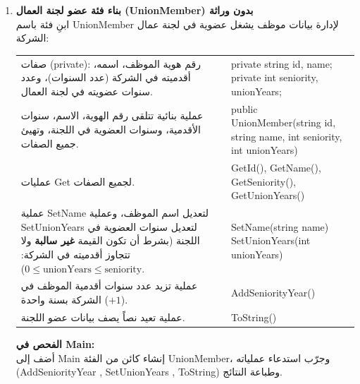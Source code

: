 \documentclass[14pt]{extarticle}
\begin{document}
\begin{enumerate}[label=\textbf{تمرين \arabic*:}, wide=0pt, itemsep=2.2em]
    \item \textbf{بناء فئة عضو لجنة العمال (\textenglish{UnionMember}) بدون وراثة} \\
    ابنِ فئة باسم \textenglish{UnionMember} لإدارة بيانات موظف يشغل عضوية في لجنة عمال الشركة:

    {\renewcommand{\arraystretch}{1.2}
    \small
    \begin{longtable}{|>{\raggedleft\arraybackslash}p{}|>{\raggedright\arraybackslash}p{}|}
    \hline
    \multicolumn{2}{|c|}{\textbf{الفئة: \textenglish{UnionMember}}} \\
    \hline
    صفات (\textenglish{private}): رقم هوية الموظف، اسمه، أقدميته في الشركة (عدد السنوات)، وعدد سنوات عضويته في لجنة العمال. & \textenglish{private string id, name;} \newline \textenglish{private int seniority, unionYears;} \\
    \hline
    عملية بنائية تتلقى رقم الهوية، الاسم، سنوات الأقدمية، وسنوات العضوية في اللجنة، وتهيئ جميع الصفات. & \textenglish{public UnionMember(string id, string name, int seniority, int unionYears)} \\
    \hline
    عمليات \textenglish{Get} لجميع الصفات. & \textenglish{GetId(), GetName(), GetSeniority(), GetUnionYears()} \\
    \hline
    عملية \textenglish{SetName} لتعديل اسم الموظف، وعملية \textenglish{SetUnionYears} لتعديل سنوات العضوية في اللجنة (بشرط أن تكون القيمة \textbf{غير سالبة} ولا تتجاوز أقدميته في الشركة: $0 \le \text{unionYears} \le \text{seniority}$). & \textenglish{SetName(string name)} \newline \textenglish{SetUnionYears(int unionYears)} \\
    \hline
    عملية تزيد عدد سنوات أقدمية الموظف في الشركة بسنة واحدة ($+1$). & \textenglish{AddSeniorityYear()} \\
    \hline
    عملية تعيد نصاً يصف بيانات عضو اللجنة. & \textenglish{ToString()} \\
    \hline
    \end{longtable}}

    \vspace{1em}
    \noindent \textbf{الفحص في \textenglish{Main}:} \\
    أضف إلى \textenglish{Main} إنشاء كائن من الفئة \textenglish{UnionMember}، وجرّب استدعاء عملياته \\
     (\textenglish{AddSeniorityYear} , \textenglish{SetUnionYears} , \textenglish{ToString}) وطباعة النتائج.
    \filbreak


\end{enumerate}
\end{document}
